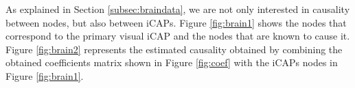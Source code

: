 \documentclass[10pt,conference,compsocconf]{IEEEtran}
\begin{document}
 As explained in Section \ref{subsec:braindata}, we are not only interested in causality between nodes, but also between iCAPs. Figure \ref{fig:brain1} shows the nodes that correspond to the primary visual iCAP and the nodes that are known to cause it. Figure  \ref{fig:brain2} represents the estimated causality obtained by combining the obtained coefficients matrix shown in Figure \ref{fig:coef} with the iCAPs nodes in Figure \ref{fig:brain1}.
\begin{figure}%
    \centering
    \hspace{0cm}

\end{figure}
\end{document}
